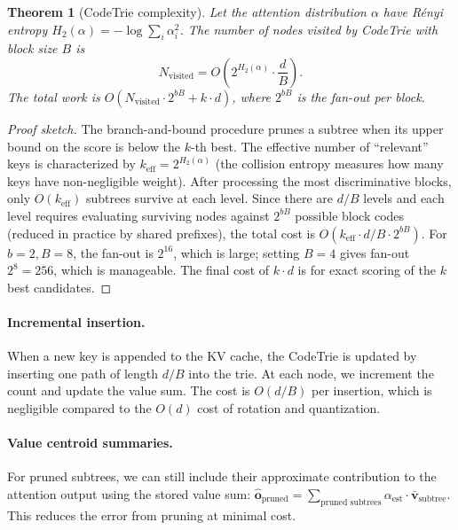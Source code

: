 \documentclass[10pt,twocolumn]{article}
\newtheorem{theorem}{Theorem}[section]
\theoremstyle{definition}
\newcommand{\bv}{\mathbf{v}}
\begin{document}
\begin{theorem}[CodeTrie complexity]
  \label{thm:codetrie}
  Let the attention distribution $\alpha$ have R\'enyi entropy
  $H_2(\alpha) = -\log\sum_i \alpha_i^2$.  The number of nodes visited by
  CodeTrie with block size $B$ is
  \begin{equation}
    N_{\text{visited}} = O\!\left(2^{H_2(\alpha)} \cdot \frac{d}{B}\right).
  \end{equation}
  The total work is $O(N_{\text{visited}} \cdot 2^{bB} + k \cdot d)$, where
  $2^{bB}$ is the fan-out per block.
\end{theorem}

\begin{proof}[Proof sketch]
  The branch-and-bound procedure prunes a subtree when its upper bound on the
  score is below the $k$-th best.  The effective number of ``relevant'' keys
  is characterized by $k_{\text{eff}} = 2^{H_2(\alpha)}$ (the collision
  entropy measures how many keys have non-negligible weight).  After processing
  the most discriminative blocks, only $O(k_{\text{eff}})$ subtrees survive at
  each level.  Since there are $d/B$ levels and each level requires evaluating
  surviving nodes against $2^{bB}$ possible block codes (reduced in practice by
  shared prefixes), the total cost is $O(k_{\text{eff}} \cdot d/B \cdot 2^{bB})$.
  For $b = 2, B = 8$, the fan-out is $2^{16}$, which is large; setting $B = 4$
  gives fan-out $2^8 = 256$, which is manageable.  The final cost of
  $k \cdot d$ is for exact scoring of the $k$ best candidates.
\end{proof}

\paragraph{Incremental insertion.}
When a new key is appended to the KV cache, the CodeTrie is updated by inserting
one path of length $d/B$ into the trie.  At each node, we increment the count
and update the value sum.  The cost is $O(d/B)$ per insertion, which is
negligible compared to the $O(d)$ cost of rotation and quantization.

\paragraph{Value centroid summaries.}
For pruned subtrees, we can still include their approximate contribution to the
attention output using the stored value sum:
$\hat{\mathbf{o}}_{\text{pruned}} = \sum_{\text{pruned subtrees}}
\alpha_{\text{est}} \cdot \bar{\bv}_{\text{subtree}}$.  This reduces the error
from pruning at minimal cost.
\end{document}
